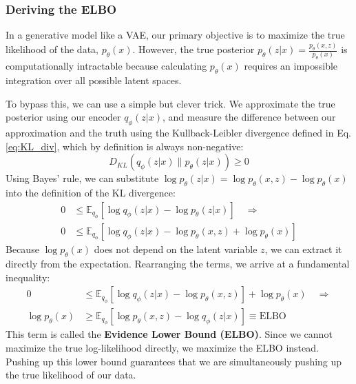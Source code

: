 \subsubsection{Deriving the ELBO}
In a generative model like a VAE, our primary objective is to maximize the true likelihood of the data, $p_\theta(x)$. However, the true posterior $p_\theta(z|x) = \frac{p_\theta(x,z)}{p_\theta(x)}$ is computationally intractable because calculating $p_\theta(x)$ requires an impossible integration over all possible latent spaces.

To bypass this, we can use a simple but clever trick. We approximate the true posterior using our encoder $q_\phi(z|x)$, and measure the difference between our approximation and the truth using the Kullback-Leibler divergence defined in Eq. \ref{eq:KL_div}, which by definition is always non-negative:
\begin{equation*}
    D_{KL}(q_\phi(z|x) \parallel p_\theta(z|x)) \ge 0
\end{equation*}
Using Bayes' rule, we can substitute $\log p_\theta(z|x) = \log p_\theta(x,z) - \log p_\theta(x)$ into the definition of the KL divergence:
\begin{equation*}
\begin{aligned}
    0 &\le \mathbb{E}_{q_\phi} [\log q_\phi(z|x) - \log p_\theta(z|x)] \quad \Rightarrow \\
    0 &\le \mathbb{E}_{q_\phi} [\log q_\phi(z|x) - \log p_\theta(x,z) + \log p_\theta(x)] 
\end{aligned}
\end{equation*}
Because $\log p_\theta(x)$ does not depend on the latent variable $z$, we can extract it directly from the expectation. Rearranging the terms, we arrive at a fundamental inequality:
\begin{equation*}
\begin{aligned}
    0 &\le \mathbb{E}_{q_\phi} [\log q_\phi(z|x) - \log p_\theta(x,z)] + \log p_\theta(x) \quad \Rightarrow \\
    \log p_\theta(x) &\ge \mathbb{E}_{q_\phi} [\log p_\theta(x,z) - \log q_\phi(z|x)] \equiv \text{ELBO}
\end{aligned}
\end{equation*}
This term is called the \textbf{Evidence Lower Bound (ELBO)}. Since we cannot maximize the true log-likelihood directly, we maximize the ELBO instead. Pushing up this lower bound guarantees that we are simultaneously pushing up the true likelihood of our data.

